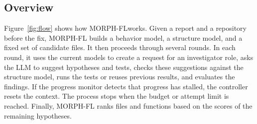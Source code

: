 \documentclass[a4paper,fleqn]{cas-sc}
\newcommand{\tool}{MORPH-FL}
\begin{document}
\subsection{Overview}\label{sec:overview}

Figure~\ref{fig:flow} shows how \tool works. Given a report and a repository before the fix, \tool{} builds a behavior model, a structure model, and a fixed set of candidate files. It then proceeds through several rounds. In each round, it uses the current models to create a request for an investigator role, asks the LLM to suggest hypotheses and tests, checks these suggestions against the structure model, runs the tests or reuses previous results, and evaluates the findings. If the progress monitor detects that progress has stalled, the controller resets the context. The process stops when the budget or attempt limit is reached. Finally, \tool{} ranks files and functions based on the scores of the remaining hypotheses.
\end{document}
